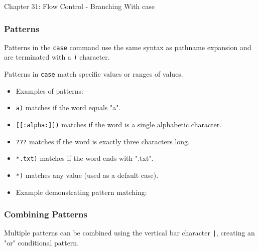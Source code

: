 \begin{notes}{Chapter 31: Flow Control - Branching With case}
\begin{highlight}
    \end{highlight}
    
    \subsubsection*{Patterns}
    
    Patterns in the \texttt{case} command use the same syntax as pathname expansion and are terminated with a \texttt{)} character.
    
    \begin{highlight}[Patterns]
    
        Patterns in \texttt{case} match specific values or ranges of values.
        
        \begin{itemize}
            \item Examples of patterns:
            \item \texttt{a)} matches if the word equals "a".
            \item \texttt{[[:alpha:]])} matches if the word is a single alphabetic character.
            \item \texttt{???} matches if the word is exactly three characters long.
            \item \texttt{*.txt)} matches if the word ends with ".txt".
            \item \texttt{*)} matches any value (used as a default case).
            \item Example demonstrating pattern matching:
        \end{itemize}

    \end{highlight}
    
    \subsubsection*{Combining Patterns}
    
    Multiple patterns can be combined using the vertical bar character \texttt{|}, creating an "or" conditional pattern.
    

\end{notes}
